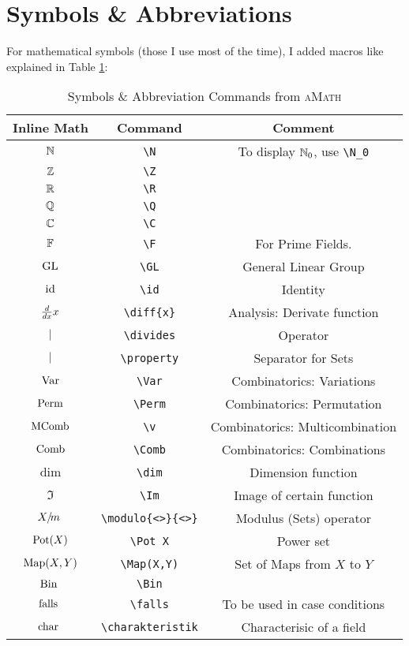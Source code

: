 \documentclass{ctext}
\begin{document}
\section{Symbols \& Abbreviations}
For mathematical symbols (those I use most of the time), I added macros like explained in Table \ref{tab:symb}:
\begin{table}[H]
  \centering
  \begin{tabular}{c|c|c}
    Inline Math & Command & Comment \\
    \hline
    \(\mathbb{N}\) & \verb|\N| & To display \(\mathbb{N}_0\), use \verb|\N_0|\\
    \(\mathbb{Z}\) & \verb|\Z| & \\
    \(\mathbb{R}\) & \verb|\R| & \\
    \(\mathbb{Q}\) & \verb|\Q| & \\
    \(\mathbb{C}\) & \verb|\C| & \\
    \(\mathbb{F}\) & \verb|\F| & For Prime Fields.\footnotemark[1]\\
    \hline
    \(\text{GL}\) & \verb|\GL| & General Linear Group \\
    \(\text{id}\) & \verb|\id| & Identity \\
    \(\frac{d}{dx}{x}\) & \verb|\diff{x}| & Analysis: Derivate function\\
    \hline
    \(\ |\ \) & \verb|\divides| & Operator \\
    \(\ |\ \) & \verb|\property| & Separator for Sets\footnotemark[2] \\
    \hline
    \(\text{Var}\) & \verb|\Var| & Combinatorics: Variations \\
    \(\text{Perm}\) & \verb|\Perm| & Combinatorics: Permutation \\
    \(\text{MComb}\) & \verb|\v| & Combinatorics: Multicombination \\
    \(\text{Comb}\) & \verb|\Comb| & Combinatorics: Combinations \\
    \hline
    \(\dim\) & \verb|\dim| & Dimension function \\
    \(\Im\) &  \verb|\Im| & Image of certain function \\
    \hline
    \(X/\!m\:\) & \verb|\modulo{<>}{<>}| & Modulus (Sets) operator \\
    \hline
    \(\text{Pot}(X)\) & \verb|\Pot X| & Power set \\
    \(\text{Map}(X,Y)\) & \verb|\Map(X,Y)| & Set of Maps from \(X\) to \(Y\) \\
    \(\text{Bin}\ \) & \verb|\Bin| & \\
    \(\text{falls}\ \) & \verb|\falls| & To be used in case conditions \\
    \(\text{char}\ \) & \verb|\charakteristik| & Characterisic of a field
  \end{tabular}
  \caption{Symbols \& Abbreviation Commands from \textsc{aMath}}
  \label{tab:symb}
\end{table}
\end{document}

